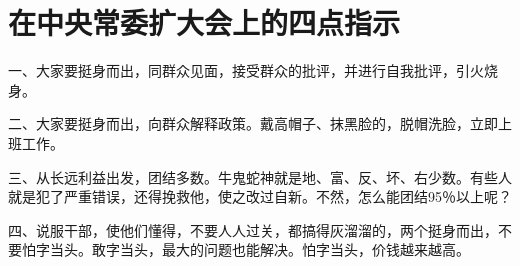 \section[在中央常委扩大会上的四点指示（一九六六年十二月）]{在中央常委扩大会上的四点指示}


一、大家要挺身而出，同群众见面，接受群众的批评，并进行自我批评，引火烧身。

二、大家要挺身而出，向群众解释政策。戴高帽子、抹黑脸的，脱帽洗脸，立即上班工作。

三、从长远利益出发，团结多数。牛鬼蛇神就是地、富、反、坏、右少数。有些人就是犯了严重错误，还得挽救他，使之改过自新。不然，怎么能团结95％以上呢？

四、说服干部，使他们懂得，不要人人过关，都搞得灰溜溜的，两个挺身而出，不要怕字当头。敢字当头，最大的问题也能解决。怕字当头，价钱越来越高。

